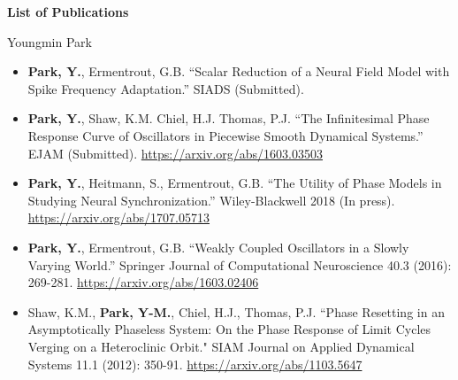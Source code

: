 \documentclass[a4paper,11pt]{article}
\begin{document}
\begin{center}
\Large \textbf{List of Publications}

\Large Youngmin Park
\end{center}

\begin{itemize}

 \item \textbf{Park, Y.}, Ermentrout, G.B. ``Scalar Reduction of a Neural Field Model with Spike Frequency Adaptation.'' SIADS (Submitted). 
 \item \textbf{Park, Y.}, Shaw, K.M. Chiel, H.J. Thomas, P.J. ``The Infinitesimal Phase Response Curve of Oscillators in Piecewise Smooth Dynamical Systems.'' EJAM (Submitted). \url{https://arxiv.org/abs/1603.03503}
 \item \textbf{Park, Y.}, Heitmann, S., Ermentrout, G.B. ``The Utility of Phase Models in Studying Neural Synchronization.'' Wiley-Blackwell 2018 (In press). \url{https://arxiv.org/abs/1707.05713}
 \item \textbf{Park, Y.}, Ermentrout, G.B. ``Weakly Coupled Oscillators in a Slowly Varying World.'' Springer Journal of Computational Neuroscience 40.3 (2016): 269-281. \url{https://arxiv.org/abs/1603.02406}
 \item Shaw, K.M., \textbf{Park, Y-M.}, Chiel, H.J., Thomas, P.J. ``Phase Resetting in an Asymptotically Phaseless System: On the Phase Response of Limit Cycles Verging on a Heteroclinic Orbit." SIAM Journal on Applied Dynamical Systems 11.1 (2012): 350-91. \url{https://arxiv.org/abs/1103.5647}
\end{itemize}
\end{document}
